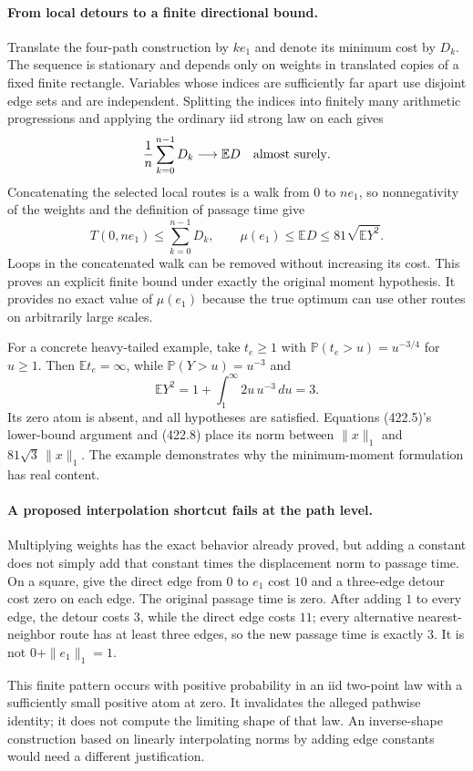 \documentclass[11pt]{article}
\begin{document}
\paragraph{From local detours to a finite directional bound.}
Translate the four-path construction by $ke_1$ and denote its minimum cost by $D_k$. The sequence is stationary and depends only on weights in translated copies of a fixed finite rectangle. Variables whose indices are sufficiently far apart use disjoint edge sets and are independent. Splitting the indices into finitely many arithmetic progressions and applying the ordinary iid strong law on each gives
\[
 \frac1n\sum_{k=0}^{n-1}D_k\longrightarrow\mathbb E D
 \quad\hbox{almost surely}.
\]
Concatenating the selected local routes is a walk from $0$ to $ne_1$, so nonnegativity of the weights and the definition of passage time give
\[
 T(0,ne_1)\le\sum_{k=0}^{n-1}D_k,
 \qquad \mu(e_1)\le\mathbb E D\le81\sqrt{\mathbb E Y^2}.
 \tag{422.8}
\]
Loops in the concatenated walk can be removed without increasing its cost. This proves an explicit finite bound under exactly the original moment hypothesis. It provides no exact value of $\mu(e_1)$ because the true optimum can use other routes on arbitrarily large scales.

For a concrete heavy-tailed example, take $t_e\ge1$ with $\mathbb P(t_e>u)=u^{-3/4}$ for $u\ge1$. Then $\mathbb E t_e=\infty$, while $\mathbb P(Y>u)=u^{-3}$ and
\[
 \mathbb E Y^2=1+\int_1^\infty2u\,u^{-3}\,du=3.
\]
Its zero atom is absent, and all hypotheses are satisfied. Equations (422.5)'s lower-bound argument and (422.8) place its norm between $\|x\|_1$ and $81\sqrt3\,\|x\|_1$. The example demonstrates why the minimum-moment formulation has real content.

\paragraph{A proposed interpolation shortcut fails at the path level.}
Multiplying weights has the exact behavior already proved, but adding a constant does not simply add that constant times the displacement norm to passage time. On a square, give the direct edge from $0$ to $e_1$ cost $10$ and a three-edge detour cost zero on each edge. The original passage time is zero. After adding $1$ to every edge, the detour costs $3$, while the direct edge costs $11$; every alternative nearest-neighbor route has at least three edges, so the new passage time is exactly $3$. It is not $0+\|e_1\|_1=1$.

This finite pattern occurs with positive probability in an iid two-point law with a sufficiently small positive atom at zero. It invalidates the alleged pathwise identity; it does not compute the limiting shape of that law. An inverse-shape construction based on linearly interpolating norms by adding edge constants would need a different justification.
\end{document}
